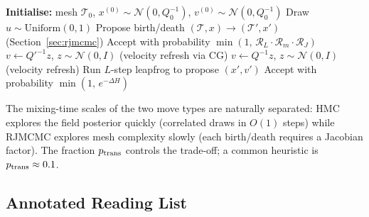 \documentclass[11pt]{article}
\begin{document}
\begin{algorithm}[H]
\caption{Joint RJMCMC + Hilbert-Space HMC}
\label{alg:rj-hmc}
\begin{algorithmic}[1]
  \State \textbf{Initialise:} mesh $\mathcal{T}_0$, $x^{(0)} \sim \mathcal{N}(0, Q_0^{-1})$,
         $v^{(0)} \sim \mathcal{N}(0, Q_0^{-1})$
    \State Draw $u \sim \mathrm{Uniform}(0,1)$
      
      \State Propose birth/death $(\mathcal{T}, x) \to (\mathcal{T}', x')$ \hfill (Section~\ref{sec:rjmcmc})
      \State Accept with probability $\min(1,\, \mathcal{R}_L \cdot \mathcal{R}_m \cdot \mathcal{R}_J)$
        \State $v \leftarrow Q'^{-1} z$, \;$z \sim \mathcal{N}(0, I)$
        \hfill (velocity refresh via CG)
      \EndIf
    \Else {}
      \State $v \leftarrow Q^{-1}z$, \;$z \sim \mathcal{N}(0, I)$
            \hfill (velocity refresh)
      \State Run $L$-step leapfrog to propose $(x', v')$
      \State Accept with probability $\min(1,\, e^{-\Delta H})$
    \EndIf
  \EndFor
\end{algorithmic}
\end{algorithm}

\noindent
The mixing-time scales of the two move types are naturally separated: HMC
explores the field posterior quickly (correlated draws in $O(1)$ steps) while
RJMCMC explores mesh complexity slowly (each birth/death requires a Jacobian
factor).  The fraction $p_{\rm trans}$ controls the trade-off; a common heuristic
is $p_{\rm trans} \approx 0.1$.

\subsection{Annotated Reading List}
\label{sec:reading-list}
\end{document}
